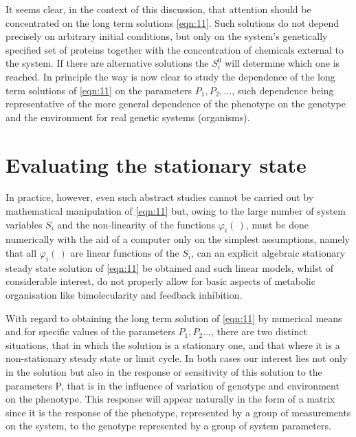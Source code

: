 It seems clear, in the context of this discussion, that attention should be concentrated on the long term solutions \eqref{eqn:11}. Such solutions do not depend precisely on arbitrary initial conditions, but only on the system's genetically specified set of proteins together with the concentration of chemicals external to the system. If there are alternative solutions the $S_{i}^{0}$ will determine which one is reached. In principle the way is now clear to study the dependence of the long term solutions of \eqref{eqn:11} on the parameters $P_{1}, P_{2}, \ldots$, such dependence being representative of the more general dependence of the phenotype on the genotype and the environment for real genetic systems (organisms).

\section{Evaluating the stationary state}

In practice, however, even such abstract studies cannot be carried out by mathematical manipulation of \eqref{eqn:11} but, owing to the large number of system variables $S_{i}$ and the non-linearity of the functions $\varphi_{i}(\hspace{2pt})$, must be done numerically with the aid of a computer only on the simplest assumptions, namely that all $\varphi_{i}(\hspace{2pt})$ are linear functions of the $S_{i}$, can an explicit algebraic stationary steady state solution of \eqref{eqn:11} be obtained and such linear models, whilst of considerable interest, do not properly allow for basic aspects of metabolic organisation like bimolecularity and feedback inhibition.

With regard to obtaining the long term solution of \eqref{eqn:11} by numerical means and for specific values of the parameters $P_{1}, P_{2} \ldots$, there are two distinct situations, that in which the solution is a stationary one, and that where it is a non-stationary steady state or limit cycle. In both cases our interest lies not only in the solution but also in the response or sensitivity of this solution to the parameters P, that is in the influence of variation of genotype and environment on the phenotype. This response will appear naturally in the form of a matrix since it is the response of the phenotype, represented by a group of measurements on the system, to the genotype represented by a group of system parameters.

